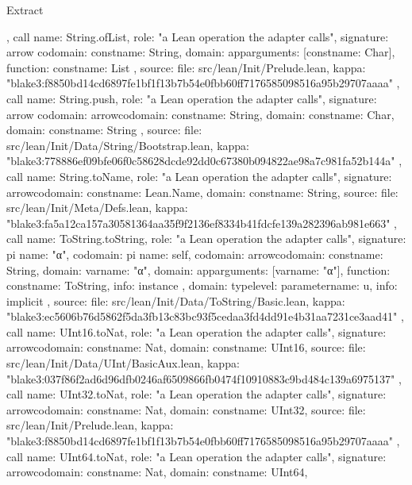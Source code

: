 \begin{lexlean}{Extract}
\begin{toolingmodule}
{{{      }
    },
    call{
      name: String.ofList,
      role: "a Lean operation the adapter calls",
      signature: arrow{
        codomain: const{name: String},
        domain: app{arguments: [const{name: Char}], function: const{name: List}}
      },
      source: {
        file: src/lean/Init/Prelude.lean,
        kappa: "blake3:f8850bd14cd6897fe1bf1f13b7b54e0fbb60ff7176585098516a95b29707aaaa"
      }
    },
    call{
      name: String.push,
      role: "a Lean operation the adapter calls",
      signature: arrow{
        codomain: arrow{codomain: const{name: String}, domain: const{name: Char}},
        domain: const{name: String}
      },
      source: {
        file: src/lean/Init/Data/String/Bootstrap.lean,
        kappa: "blake3:778886ef09bfe06f0c58628dcde92dd0c67380b094822ae98a7c981fa52b144a"
      }
    },
    call{
      name: String.toName,
      role: "a Lean operation the adapter calls",
      signature: arrow{codomain: const{name: Lean.Name}, domain: const{name: String}},
      source: {
        file: src/lean/Init/Meta/Defs.lean,
        kappa: "blake3:fa5a12ca157a30581364aa35f9f2136ef8334b41fdcfe139a282396ab981e663"
      }
    },
    call{
      name: ToString.toString,
      role: "a Lean operation the adapter calls",
      signature: pi{
        name: "α",
        codomain: pi{
          name: self,
          codomain: arrow{codomain: const{name: String}, domain: var{name: "α"}},
          domain: app{arguments: [var{name: "α"}], function: const{name: ToString}},
          info: instance
        },
        domain: type{level: parameter{name: u}},
        info: implicit
      },
      source: {
        file: src/lean/Init/Data/ToString/Basic.lean,
        kappa: "blake3:ec5606b76d5862f5da3fb13c83bc93f5cedaa3fd4dd91e4b31aa7231ce3aad41"
      }
    },
    call{
      name: UInt16.toNat,
      role: "a Lean operation the adapter calls",
      signature: arrow{codomain: const{name: Nat}, domain: const{name: UInt16}},
      source: {
        file: src/lean/Init/Data/UInt/BasicAux.lean,
        kappa: "blake3:037f86f2ad6d96dfb0246af6509866fb0474f10910883c9bd484c139a6975137"
      }
    },
    call{
      name: UInt32.toNat,
      role: "a Lean operation the adapter calls",
      signature: arrow{codomain: const{name: Nat}, domain: const{name: UInt32}},
      source: {
        file: src/lean/Init/Prelude.lean,
        kappa: "blake3:f8850bd14cd6897fe1bf1f13b7b54e0fbb60ff7176585098516a95b29707aaaa"
      }
    },
    call{
      name: UInt64.toNat,
      role: "a Lean operation the adapter calls",
      signature: arrow{codomain: const{name: Nat}, domain: const{name: UInt64}},
}}
\end{toolingmodule}
\end{lexlean}
